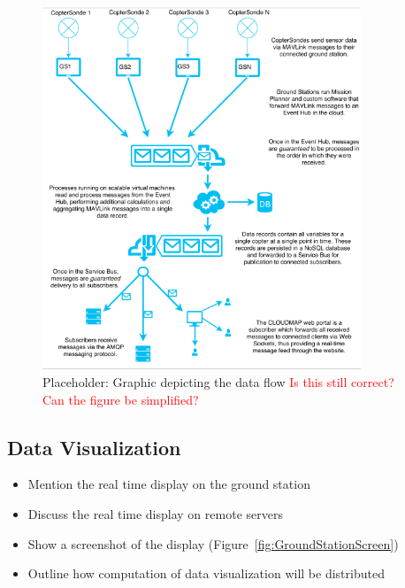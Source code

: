 \documentclass[sensors,review,submit,moreauthors,pdftex,10pt,a4paper]{mdpi}
\theoremstyle{mdpi}
\newcounter{ex}
\newcounter{re}
\theoremstyle{mdpidefinition}
\begin{document}
\begin{figure}
\centering
\includegraphics[angle=0, width=0.85\textwidth]{figures/dataFlow.pdf}
\caption{\label{fig:DataFlow} Placeholder: Graphic depicting the data flow \textcolor{red}{Is this still correct? Can the figure be simplified?}}
\end{figure}

\subsection{Data Visualization}
\begin{itemize}[leftmargin=*,labelsep=4mm]
\color{blue}
\item	Mention the real time display on the ground station
\item	Discuss the real time display on remote servers
\item	Show a screenshot of the display (Figure~\ref{fig:GroundStationScreen})
\item	Outline how computation of data visualization will be distributed
\end{itemize}
\end{document}
